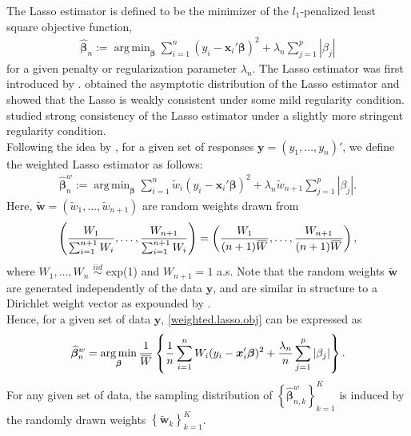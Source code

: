 \documentclass[12pt]{article}
\DeclareMathOperator*{\argmin}{arg\,min} %
\newcommand{\bnw}{\widehat{\bm{\beta}}_n^w} %
\newcommand{\be}{\bm{\beta}} %
\newcommand{\sumin}{\sum_{i=1}^n} %
\newcommand{\dn}{\frac{1}{n}} %
\newcommand{\overbar}[1]{\mkern 2mu\overline{\mkern-2mu#1\mkern-2mu}\mkern 2mu}
\newcommand{\x}{\bm{x}_i} %
\begin{document}
The Lasso estimator is defined to be the minimizer of the $l_1$-penalized least square objective function,
	\begin{align} \label{lasso.obj}   
	\widehat{\be}_n 
	:= \argmin_{\be} 
		\sumin ( y_i - \x' \be )^2 
		+ \lambda_n \sum_{j=1}^p |\beta_j|
	\end{align}
\noindent for a given penalty or regularization parameter $\lambda_n$. The Lasso estimator was first introduced by \citet{Lasso}. \citet{Knight&Fu} obtained the asymptotic distribution of the Lasso estimator and showed that the Lasso is weakly consistent under some mild regularity condition. \citet{Chatterjee&Lahiri} studied strong consistency of the Lasso estimator under a slightly more stringent regularity condition. \\

Following the idea by \citet{Newton&Raftery}, for a given set of responses $\bm{y} = (y_1, \ldots, y_n)'$, we define the weighted Lasso estimator as follows:
	\begin{align} \label{weighted.lasso.obj}   
	\bnw := \argmin_{\be} 
			\sumin \widetilde{w}_i ( y_i - \x' \be )^2 
			+ \lambda_n \widetilde{w}_{n+1} \sum_{j=1}^p |\beta_j|.
	\end{align}
\noindent Here, $\widetilde{\bm{w}} = ( \widetilde{w}_1, \ldots, \widetilde{w}_{n+1} )$ are random weights drawn from
	\begin{align*}
	\left(
		\dfrac{W_1}{ \sum_{i=1}^{n+1} W_i}
		, \ldots, 
		\dfrac{ W_{n+1} }{ \sum_{i=1}^{n+1} W_i}
	\right)
	= 
	\left(
		\dfrac{W_1}{ (n+1) \overbar{W} }
		, \ldots, 
		\dfrac{ W_{n+1} }{ (n+1) \overbar{W} }
	\right),
	\end{align*} 
\noindent where $W_1, \ldots, W_n$ $\stackrel{iid}{\sim}$ exp(1) and $W_{n+1} = 1$ a.s. Note that the random weights $\widetilde{\bm{w}}$ are generated independently of the data $\bm{y}$, and are similar in structure to a Dirichlet weight vector as expounded by \citet{Newton&Raftery}. \\

Hence, for a given set of data $\bm{y}$, \eqref{weighted.lasso.obj} can be expressed as
	\begin{align} \label{weighted.lasso.obj2}   
	\bnw = \argmin_{\be}
			\dfrac{1}{\overbar{W}}
			\left\{
				\dn \sumin W_i ( y_i - \x' \be )^2 
				+ \dfrac{\lambda_n}{n} \sum_{j=1}^p |\beta_j|
			\right\}. 
	\end{align}
For any given set of data, the sampling distribution of $\left\{ \widehat{\be}^w_{n,k} \right\}^K_{k=1}$ is induced by the randomly drawn weights $\left\{ \widetilde{\bm{w}}_k \right\}^K_{k=1}$.         	  	  
\end{document}
